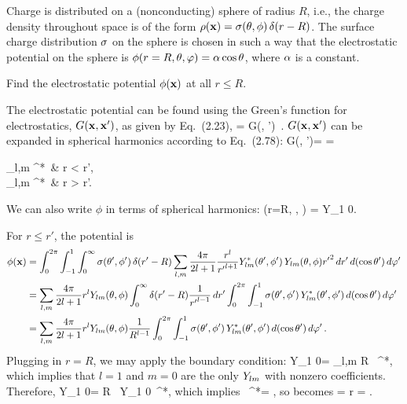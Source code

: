 \newcommand{\Gxxp}{G(\vx, \vx')}
\newcommand{\intoi}{\int_0^\infty}

\begin{statement}{}
	Charge is distributed on a (nonconducting) sphere of radius $R$, i.e., the charge density throughout space is of the form $\rho(\mathbf{x}) = \sigma(\theta, \phi) \, \delta(r - R)$.  The surface charge distribution $\sigma$ on the sphere is chosen in such a way that the electrostatic potential on the sphere is $\phi(r=R, \theta, \varphi) = \alpha \cos\theta$, where $\alpha$ is a constant.
\end{statement}

\begin{problem} \label{3a}
	Find the electrostatic potential $\phi(\mathbf{x})$ at all $r \leq R$.
\end{problem}

\begin{solution}
	The electrostatic potential can be found using the Green's function for electrostatics, $\Gxxp$, as given by Eq.~(2.23),
	\beq
		\phix = \int \Gxxp \, \rhoxp \dcxp.
	\eeq
	$\Gxxp$ can be expanded in spherical harmonics according to Eq.~(2.78):
	\beq
		\Gxxp = \frac{1}{\abs{\vx - \vx'}}
		= \begin{cases} \sum_{l,m}   \Ylm^*\tvp \, \Ylm\tv &  r < r', \\
		\sum_{l,m}   \Ylm^*\tvp \, \Ylm\tv &  r > r'. \end{cases}
	\eeq
	We can also write $\phi$ in terms of spherical harmonics:
	\beq
		\phi(r=R, \tht, \vph) = \alp {} Y_{1 0}\tv.
	\eeq
	
	For $r \leq r'$, the potential is
	\begin{align}
		\phix &= \intotp \intono \intoi \sig\tvp \, \delta(r' - R) \sum_{l,m} \frac{4\pi}{2l + 1} \frac{r^l}{{r'}^{l + 1}} \Ylm^*\tvp \, \Ylm\tv {r'}^2 \drp \dctp \dvp \notag \\
		&= \sum_{l,m} \frac{4\pi}{2l + 1} r^l \Ylm\tv \intoi \delta(r' - R) \frac{1}{{r'}^{l - 1}} \drp \intotp \intono \sig\tvp \, \Ylm^*\tvp \dctp \dvp \notag \\
		&= \sum_{l,m} \frac{4\pi}{2l + 1} r^l \Ylm\tv \frac{1}{R^{l - 1}} \intotp \intono \sig\tvp \, \Ylm^*\tvp \dctp \dvp. \label{pot1ax}
	\end{align}
	Plugging in $r = R$, we may apply the boundary condition:
	\beq
		\alp {} Y_{1 0}\tv = \sum_{l,m}  R \Ylm\tv \intotp \intono \sig\tvp \, \Ylm^*\tvp \dctp \dvp,
	\eeq
	which implies that $l = 1$ and $m = 0$ are the only $Y_{l m}$ with nonzero coefficients.  Therefore,
	\beq
		\alp {} Y_{1 0}\tv =  R \, Y_{1 0}\tv \intotp \intono \sig\tvp \, \Ylm^*\tvp \dctp \dvp,
	\eeq
	which implies
	\beqn \label{integ}
		\intotp \intono \sig\tvp \, \Ylm^*\tvp \dctp \dvp =  ,
	\eeqn
	so  becomes
	\beq
		\phix =  r  \cost {}  
		= \alp {} \cost.
	\eeq
\end{solution}
\vfix


